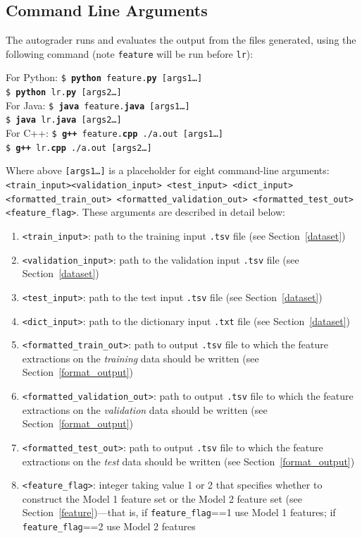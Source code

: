\documentclass[11pt,addpoints,answers]{exam}
\begin{document}
\subsection{Command Line Arguments}
The autograder runs and evaluates the output from the files generated, using the following command (note \lstinline{feature} will be run before \lstinline{lr}):

\begin{tabbing}
For Python: \=\texttt{\$ \textbf{python} feature.\textbf{py} [args1\dots]}\\
\>\texttt{\$ \textbf{python} lr.\textbf{py} [args2\dots]}\\
For Java: \>\texttt{\$ \textbf{java} feature.\textbf{java} [args1\dots]}\\
\>\texttt{\$ \textbf{java} lr.\textbf{java} [args2\dots]}\\
For C++: \>\texttt{\$ \textbf{g++} feature.\textbf{cpp} ./a.out [args1\dots]}\\
\>\texttt{\$ \textbf{g++} lr.\textbf{cpp} ./a.out [args2\dots]}
\end{tabbing}

Where above \texttt{[args1\dots]} is a placeholder for eight command-line arguments: \texttt{<train\_input>}\newline \texttt{<validation\_input> <test\_input> <dict\_input> <formatted\_train\_out> \newline <formatted\_validation\_out>  <formatted\_test\_out> <feature\_flag>}. These arguments are described in detail below:
\begin{enumerate}
    \item \texttt{<train\_input>}: path to the training input \texttt{.tsv} file (see Section~\ref{dataset})
    \item \texttt{<validation\_input>}: path to the validation input \texttt{.tsv} file (see Section~\ref{dataset})
    \item \texttt{<test\_input>}: path to the test input \texttt{.tsv} file (see Section~\ref{dataset})
    \item \texttt{<dict\_input>}: path to the dictionary input \texttt{.txt} file (see Section~\ref{dataset})
    \item \texttt{<formatted\_train\_out>}: path to output \texttt{.tsv} file to which the feature extractions on the \emph{training} data should be written (see Section~\ref{format_output})
    \item \texttt{<formatted\_validation\_out>}: path to output \texttt{.tsv} file to which the feature extractions on the \emph{validation} data should be written (see Section~\ref{format_output})
    \item \texttt{<formatted\_test\_out>}: path to output \texttt{.tsv} file to which the feature extractions on the \emph{test} data should be written (see Section~\ref{format_output})
    \item \texttt{<feature\_flag>}: integer taking value 1 or 2 that specifies whether to construct the Model 1 feature set or the Model 2 feature set (see Section~\ref{feature})---that is, if \lstinline{feature_flag}==1 use Model 1 features; if \lstinline{feature_flag}==2 use Model 2 features
\end{enumerate}
\end{document}
